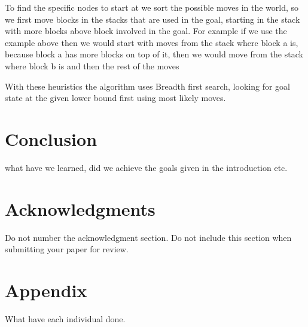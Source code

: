 \documentclass[11pt]{article}
\begin{document}
To find the specific nodes to start at we sort the possible moves in the world, so we first move blocks in the stacks that are used in the goal, starting in the stack with more blocks above block involved in the goal. For example if we use the example above then we would  start with moves from the stack where block a is, because block a has more blocks on top of it, then we would move from the stack where block b is and then the rest of the moves

With these heuristics the algorithm uses Breadth first search, looking for goal state at the given lower bound first using most likely moves.

\section*{Conclusion}
 what have we learned, did we achieve the goals given in the introduction etc.

\section*{Acknowledgments}

Do not number the acknowledgment section. Do not include this section
when submitting your paper for review.




\section*{Appendix}
What have each individual done.






\end{document}
